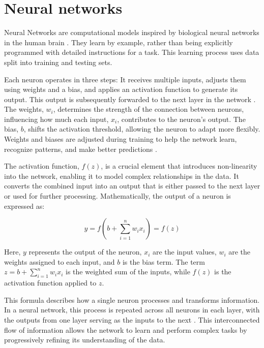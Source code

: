 
\section{Neural networks}

Neural Networks are computational models inspired by biological neural networks in the human brain \cite{wikipedia_neural_network}. They learn by example, rather than being explicitly programmed with detailed instructions for a task. This learning process uses data split into training and testing sets. 

Each neuron operates in three steps: It receives multiple inputs, adjusts them using weights and a bias, and applies an activation function to generate its output. This output is subsequently forwarded to the next layer in the network \cite{dagostino_neural_networks}. The weights, \( w_i \), determines the strength of the connection between neurons, influencing how much each input, \( x_i \), contributes to the neuron’s output. The bias, \( b \), shifts the activation threshold, allowing the neuron to adapt more flexibly. Weights and biases are adjusted during training to help the network learn, recognize patterns, and make better predictions \cite{paperspace_weights_biases}.

The activation function, \( f(z) \),  is a crucial element that introduces non-linearity into the network, enabling it to model complex relationships in the data. It converts the combined input into an output that is either passed to the next layer or used for further processing. Mathematically, the output of a neuron is expressed as:

\begin{equation}
   y = f\left(b + \sum_{i=1}^{n} w_i x_i\right) = f(z)
   \label{neuralnetwork}
\end{equation}

Here, \( y \) represents the output of the neuron, \( x_i \) are the input values, \( w_i \) are the weights assigned to each input, and \( b \) is the bias term. The term \( z = b + \sum_{i=1}^n w_i x_i \) is the weighted sum of the inputs, while \( f(z) \) is the activation function applied to \( z \).

This formula describes how a single neuron processes and transforms information. In a neural network, this process is repeated across all neurons in each layer, with the outputs from one layer serving as the inputs to the next \cite{dagostino_neural_networks}. This interconnected flow of information allows the network to learn and perform complex tasks by progressively refining its understanding of the data.


